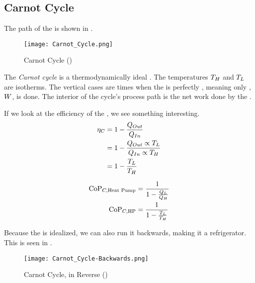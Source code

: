 \subsection{Carnot Cycle}\label{subsec:Carnot_Cycle}
The  path of the  is shown in .

\begin{figure}[h!tbp]
  \centering
  \texttt{[image: Carnot\_Cycle.png]}
  \caption{Carnot Cycle (\cite[pg. 252]{ThermoTextbook})}
  \label{fig:Carnot_Cycle}
\end{figure}

\begin{definition}\label{def:Carnot_Cycle}
  The \emph{Carnot cycle} is a thermodynamically ideal .
  The temperatures $T_{H}$ and $T_{L}$ are isotherms.
  The vertical cases are times when the  is perfectly , meaning only , $W$, is done.
  The interior of the cycle's process path is the net work done by the .
\end{definition}

If we look at the efficiency of the , we see something interesting.
\begin{align*}
  \eta_{C} &= 1 - \frac{Q_{Out}}{Q_{In}} \\
                  &= 1 - \frac{Q_{Out} \propto T_{L}}{Q_{In} \propto T_{H}} \\
                  &= 1 - \frac{T_{L}}{T_{H}}
\end{align*}

\begin{equation}\label{eq:Coefficient_of_Performance-Carnot_Cycle}
  \begin{aligned}
    \text{CoP}_{C, \text{Heat Pump}} &= \frac{1}{1 - \frac{Q_{L}}{Q_{H}}} \\
    \text{CoP}_{C, \text{HP}} &= \frac{1}{1 - \frac{T_{L}}{T_{H}}} \\
  \end{aligned}
\end{equation}

Because the  is idealized, we can also run it backwards, making it a refrigerator.
This is seen in .

\begin{figure}[h!tbp]
  \centering
  \texttt{[image: Carnot\_Cycle-Backwards.png]}
  \caption{Carnot Cycle, in Reverse (\cite[pg. 253]{ThermoTextbook})}
  \label{fig:Carnot_Cycle-Backwards}
\end{figure}

